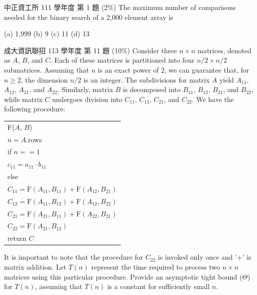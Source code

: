 \begin{pastexam}[label={px:dc-2}]{中正資工所 111 學年度 第 1 題}
(2\%) The maximum number of comparisons needed for the binary search of a 2,000 element
array is

(a) 1,999 \qquad (b) 9 \qquad (c) 11 \qquad (d) 13
\end{pastexam}

\begin{pastexam}[label={px:dc-3}]{成大資訊聯招 113 學年度 第 11 題}
(10\%) Consider three $n\times n$ matrices, denoted as $A$, $B$, and $C$. Each of these
matrices is partitioned into four $n/2\times n/2$ submatrices. Assuming that $n$ is an exact
power of 2, we can guarantee that, for $n\ge 2$, the dimension $n/2$ is an integer. The
subdivisions for matrix $A$ yield $A_{11}$, $A_{12}$, $A_{21}$, and $A_{22}$. Similarly,
matrix $B$ is decomposed into $B_{11}$, $B_{12}$, $B_{21}$, and $B_{22}$, while matrix $C$
undergoes division into $C_{11}$, $C_{12}$, $C_{21}$, and $C_{22}$. We have the following
procedure:
\par\vspace{1ex}
{\centering
\begin{tabular}{|l|}
\hline
F($A$, $B$)\\
\hspace*{2em}$n=A$.rows\\
\hspace*{2em}if $n==1$\\
\hspace*{4em}$c_{11}=a_{11}\cdot b_{11}$\\
\hspace*{2em}else\\
\hspace*{4em}$C_{11}=\mathrm{F}(A_{11},B_{11})+\mathrm{F}(A_{12},B_{21})$\\
\hspace*{4em}$C_{12}=\mathrm{F}(A_{11},B_{12})+\mathrm{F}(A_{12},B_{22})$\\
\hspace*{4em}$C_{21}=\mathrm{F}(A_{21},B_{11})+\mathrm{F}(A_{22},B_{21})$\\
\hspace*{4em}$C_{22}=\mathrm{F}(A_{21},B_{12})$\\
\hspace*{2em}return $C$\\
\hline
\end{tabular}\par}
\vspace{1ex}
It is important to note that the procedure for $C_{22}$ is invoked only once and '+' is
matrix addition. Let $T(n)$ represent the time required to process two $n\times n$ matrices
using this particular procedure. Provide an asymptotic tight bound ($\Theta$) for $T(n)$,
assuming that $T(n)$ is a constant for sufficiently small $n$.
\end{pastexam}

